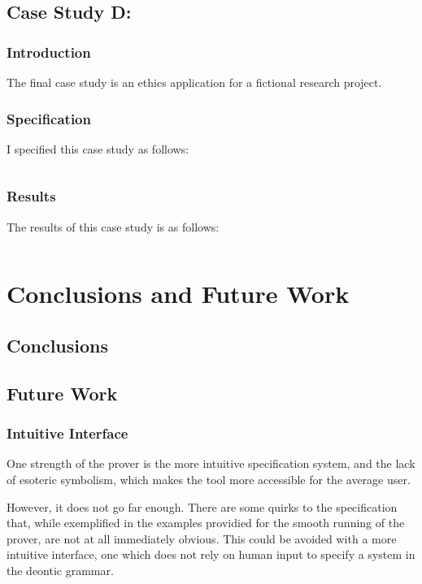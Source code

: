\documentclass{l4proj}
\begin{document}
\section{Case Study D: }
\subsection{Introduction}
The final case study is an ethics application for a fictional research project. 

\subsection{Specification}
I specified this case study as follows: 
\begin{verbatim}

\end{verbatim}
\subsection{Results}
The results of this case study is as follows: 
\begin{verbatim}

\end{verbatim}
\chapter{Conclusions and Future Work}

\section{Conclusions}

\section{Future Work}

\subsection{Intuitive Interface}
One strength of the prover is the more intuitive specification system, and the lack of esoteric symbolism, which makes the tool more accessible for the average user. 

However, it does not go far enough. There are some quirks to the specification that, while exemplified in the examples providied for the smooth running of the prover, are not at all immediately obvious. This could be avoided with a more intuitive interface, one which does not rely on human input to specify a system in the deontic grammar. 
\end{document}
